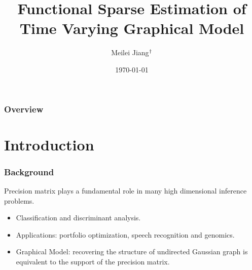 \documentclass{beamer}
\date{\today} %
\title[Department of Statistics and Operations Research]{Functional Sparse Estimation of Time Varying Graphical Model} %
\author[Meilei Jiang(UNC-CH)]{Meilei Jiang$^\text{\dag}$} %
\institute %
{
$^\text{\dag}$Department of Statistics and Operations Research\\
 University of North Carolina at Chapel Hill \\ %
}
\begin{document}
\begin{frame}
\titlepage %
\end{frame}

\begin{frame}
\frametitle{Overview} %
\tableofcontents %
\end{frame}





\section{Introduction}

\begin{frame}
	\frametitle{Background}
	Precision matrix plays a fundamental role in many high dimensional inference problems.
	\begin{itemize}[<+->]
		\item Classification and discriminant analysis.
		\item Applications: portfolio optimization, speech recognition and genomics.
		\item Graphical Model: recovering the structure of undirected Gaussian graph is equivalent to the support of the precision matrix.
	\end{itemize}
	
\end{frame}
\end{document}
